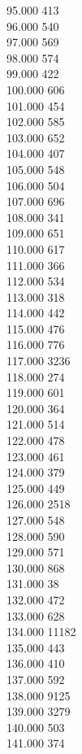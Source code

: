 { 95.000	413 \\
 96.000	540 \\
 97.000	569 \\
 98.000	574 \\
 99.000	422 \\
 100.000	606 \\
 101.000	454 \\
 102.000	585 \\
 103.000	652 \\
 104.000	407 \\
 105.000	548 \\
 106.000	504 \\
 107.000	696 \\
 108.000	341 \\
 109.000	651 \\
 110.000	617 \\
 111.000	366 \\
 112.000	534 \\
 113.000	318 \\
 114.000	442 \\
 115.000	476 \\
 116.000	776 \\
 117.000	3236 \\
 118.000	274 \\
 119.000	601 \\
 120.000	364 \\
 121.000	514 \\
 122.000	478 \\
 123.000	461 \\
 124.000	379 \\
 125.000	449 \\
 126.000	2518 \\
 127.000	548 \\
 128.000	590 \\
 129.000	571 \\
 130.000	868 \\
 131.000	38 \\
 132.000	472 \\
 133.000	628 \\
 134.000	11182 \\
 135.000	443 \\
 136.000	410 \\
 137.000	592 \\
 138.000	9125 \\
 139.000	3279 \\
 140.000	503 \\
 141.000	374 \\
}
